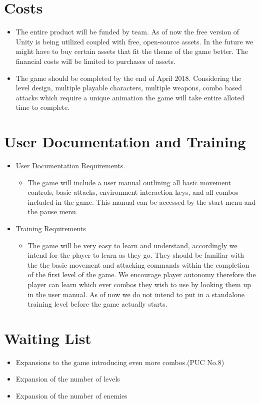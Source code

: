 \documentclass{article}
\begin{document}
	\section{Costs}
	\begin{itemize}
		\item The entire product will be funded by team. As of now the free version of Unity is being utilized coupled with free, open-source assets. In the future we might have to buy certain assets that fit the theme of the game better. The financial costs will be limited to purchases of assets.
		\item The game should be completed by the end of April 2018. Considering the level design, multiple playable characters, multiple weapons, combo based attacks which require a unique animation the game will take entire alloted time to complete.
	\end{itemize}

	\section{User Documentation and Training}
	\begin{itemize}
		\item User Documentation Requirements.
		\begin{itemize}
			\item The game will include a user manual outlining all basic movement controls, basic attacks, environment interaction keys, and all combos included in the game. This manual can be accessed by the start menu and the pause menu.
		\end{itemize}
		\item Training Requirements
		\begin{itemize}
			\item The game will be very easy to learn and understand, accordingly we intend for the player to learn as they go. They should be familiar with the the basic movement and attacking commands within the completion of the first level of the game. We encourage player autonomy therefore the player can learn which ever combos they wish to use by looking them up in the user manual. As of now we do not intend to put in a standalone training level before the game actually starts.
		\end{itemize}
	\end{itemize}

	\section{Waiting List}
	\begin{itemize}
		\item Expansions to the game introducing even more combos.(PUC No.8)
		\item Expansion of the number of levels
		\item Expansion of the number of enemies
	\end{itemize}
\end{document}

